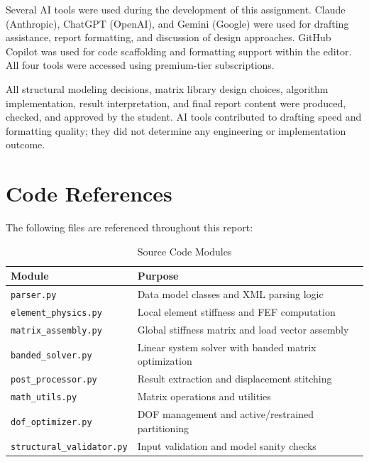 \documentclass[12pt,a4paper]{article}
\begin{document}
Several AI tools were used during the development of this assignment. Claude (Anthropic), ChatGPT (OpenAI), and Gemini (Google) were used for drafting assistance, report formatting, and discussion of design approaches. GitHub Copilot was used for code scaffolding and formatting support within the editor. All four tools were accessed using premium-tier subscriptions.

All structural modeling decisions, matrix library design choices, algorithm implementation, result interpretation, and final report content were produced, checked, and approved by the student. AI tools contributed to drafting speed and formatting quality; they did not determine any engineering or implementation outcome.


\appendix

\section{Code References}

The following files are referenced throughout this report:

\begin{table}[H]
    \centering
    \caption{Source Code Modules}
    \label{tab:code_modules}
    \begin{tabular}{lp{}}
        \toprule
        \textbf{Module} & \textbf{Purpose} \\
        \midrule
        \texttt{parser.py} & Data model classes and XML parsing logic \\
        \texttt{element\_physics.py} & Local element stiffness and FEF computation \\
        \texttt{matrix\_assembly.py} & Global stiffness matrix and load vector assembly \\
        \texttt{banded\_solver.py} & Linear system solver with banded matrix optimization \\
        \texttt{post\_processor.py} & Result extraction and displacement stitching \\
        \texttt{math\_utils.py} & Matrix operations and utilities \\
        \texttt{dof\_optimizer.py} & DOF management and active/restrained partitioning \\
        \texttt{structural\_validator.py} & Input validation and model sanity checks \\
        \bottomrule
    \end{tabular}
\end{table}
\end{document}
